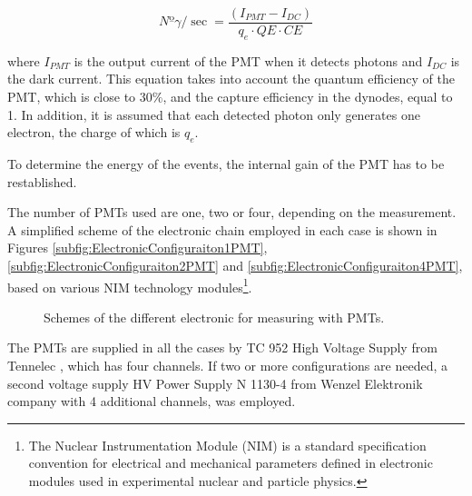 \begin{equation}
Nº\gamma/\sec = \frac{\left( I_{PMT} - I_{DC} \right)}{q_e \cdot{} QE \cdot{} CE}
\label{eq:NumPhotonsFromIntensityPMT}
\end{equation}

where $I_{PMT}$ is the output current of the PMT when it detects photons and $I_{DC}$ is the dark current. This equation takes into account the quantum efficiency of the PMT, which is close to $30\%$, and the capture efficiency in the dynodes, equal to 1. In addition, it is assumed that each detected photon only generates one electron, the charge of which is $q_e$.

To determine the energy of the events, the internal gain of the PMT has to be restablished. 

The number of PMTs used are one, two or four, depending on the measurement. A simplified scheme of the electronic chain employed in each case is shown in Figures \ref{subfig:ElectronicConfiguraiton1PMT}, \ref{subfig:ElectronicConfiguraiton2PMT} and \ref{subfig:ElectronicConfiguraiton4PMT}, based on various NIM technology modules\footnote{The Nuclear Instrumentation Module (NIM) is a standard specification convention for electrical and mechanical parameters defined in electronic modules used in experimental nuclear and particle physics.}.

\begin{figure}[htbp]
 \centering
    \newline  
    \newline
 \caption{Schemes of the different electronic for measuring with PMTs.}
 \label{fig:ElectronicConfiguraitonsPMT}
\end{figure}

The PMTs are supplied in all the cases by TC 952 High Voltage Supply from Tennelec \cite{DataSheetHVSupplyTennelec}, which has four channels. If two or more configurations are needed, a second voltage supply HV Power Supply N 1130-4 from Wenzel Elektronik company \cite{DataSheetHVSupplyWenzel} with 4 additional channels, was employed. 

